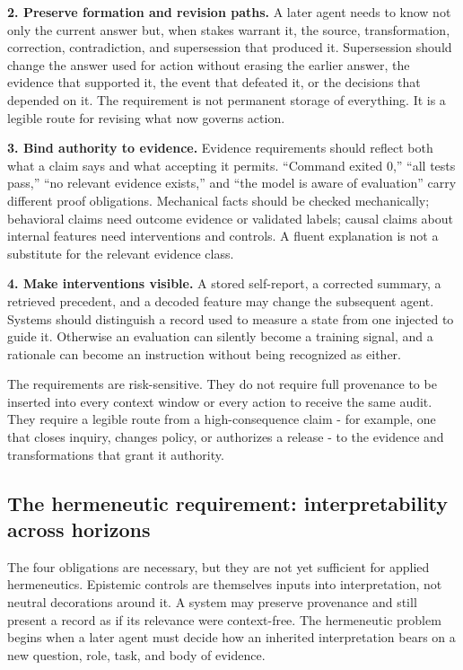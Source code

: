 \documentclass[12pt]{article}
\begin{document}
\textbf{2. Preserve formation and revision paths.} A later agent needs to know not only the current answer but, when stakes warrant it, the source, transformation, correction, contradiction, and supersession that produced it. Supersession should change the answer used for action without erasing the earlier answer, the evidence that supported it, the event that defeated it, or the decisions that depended on it. The requirement is not permanent storage of everything. It is a legible route for revising what now governs action.

\textbf{3. Bind authority to evidence.} Evidence requirements should reflect both what a claim says and what accepting it permits. ``Command exited 0,'' ``all tests pass,'' ``no relevant evidence exists,'' and ``the model is aware of evaluation'' carry different proof obligations. Mechanical facts should be checked mechanically; behavioral claims need outcome evidence or validated labels; causal claims about internal features need interventions and controls. A fluent explanation is not a substitute for the relevant evidence class.

\textbf{4. Make interventions visible.} A stored self-report, a corrected summary, a retrieved precedent, and a decoded feature may change the subsequent agent. Systems should distinguish a record used to measure a state from one injected to guide it. Otherwise an evaluation can silently become a training signal, and a rationale can become an instruction without being recognized as either.

The requirements are risk-sensitive. They do not require full provenance to be inserted into every context window or every action to receive the same audit. They require a legible route from a high-consequence claim - for example, one that closes inquiry, changes policy, or authorizes a release - to the evidence and transformations that grant it authority.

\subsection{The hermeneutic requirement: interpretability across horizons}\label{the-hermeneutic-requirement-interpretability-across-horizons}

The four obligations are necessary, but they are not yet sufficient for applied hermeneutics. Epistemic controls are themselves inputs into interpretation, not neutral decorations around it. A system may preserve provenance and still present a record as if its relevance were context-free. The hermeneutic problem begins when a later agent must decide how an inherited interpretation bears on a new question, role, task, and body of evidence.
\end{document}
